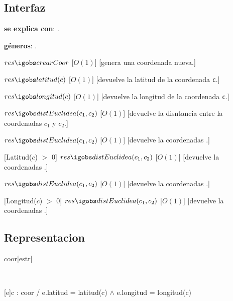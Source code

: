 \begin{Interfaz}
\subsection{Interfaz}


  \textbf{se explica con}: .

  \textbf{g\'eneros}: .



  {$res \igobs crearCoor$}%
  [$O(1)$]
  [genera una coordenada nueva.]


  {$res \igobs latitud(c)$}
  [$O(1)$]
  [devuelve la latitud de la coordenada \texttt{c}.]

  {$res \igobs longitud(c)$}
  [$O(1)$]
  [devuelve la longitud de la coordenada \texttt{c}.]


  {$res \igobs distEuclidea(c_1, c_2)$}%
  [$O(1)$]
  [devuelve la disntancia entre la coordenadas \texttt{$c_1$} y \texttt{$c_2$}.]

  {$res \igobs distEuclidea(c_1, c_2)$}
  [$O(1)$]
  [devuelve la coordenadas .]

  [Latitud($c$) $>$ 0]
  {$res \igobs distEuclidea(c_1, c_2)$}
  [$O(1)$]
  [devuelve la coordenadas .]

  {$res \igobs distEuclidea(c_1, c_2)$}
  [$O(1)$]
  [devuelve la coordenadas .]

  [Longitud($c$) $>$ 0]
  {$res \igobs distEuclidea(c_1, c_2)$}
  [$O(1)$]
  [devuelve la coordenadas .]


\end{Interfaz}

\begin{Representacion}
\subsection{Representacion}
 
  \begin{Estructura}{coor}[estr]
      \begin{Tupla}[estr]%
    \end{Tupla}
  \end{Estructura}


  ~

  [e]{c : coor / e.latitud = latitud(c) $\land$ e.longitud = longitud(c)}

\end{Representacion}

